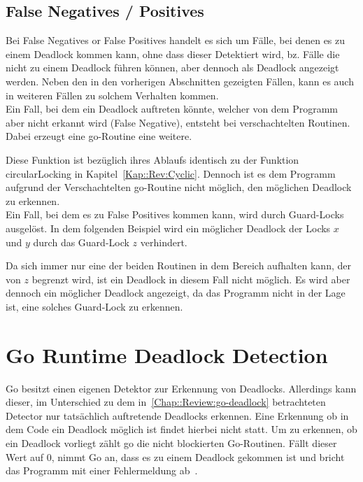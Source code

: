 \subsection{False Negatives / Positives}
Bei False Negatives or False Positives handelt es sich um Fälle, bei denen es 
zu einem Deadlock kommen kann, ohne dass dieser Detektiert wird, bz. Fälle die
nicht zu einem 
Deadlock führen können, aber dennoch als Deadlock angezeigt werden. 
Neben den in den vorherigen Abschnitten gezeigten Fällen, kann es auch in weiteren 
Fällen zu solchem Verhalten kommen.\\
Ein Fall,
bei dem ein Deadlock auftreten könnte, welcher von dem Programm aber nicht erkannt
wird (False Negative), entsteht bei verschachtelten Routinen. Dabei erzeugt eine go-Routine eine 
weitere.
\begin{figure}[H]
    
\end{figure}
Diese Funktion ist bezüglich ihres Ablaufs identisch zu der Funktion 
circularLocking in Kapitel~\ref*{Kap::Rev:Cyclic}. Dennoch ist es dem 
Programm aufgrund der Verschachtelten go-Routine nicht möglich, den möglichen 
Deadlock zu erkennen. \\
Ein Fall, bei dem es zu False Positives kommen kann, wird durch Guard-Locks
ausgelöst. In dem folgenden Beispiel wird ein möglicher Deadlock der Locks $x$
und $y$ durch das Guard-Lock $z$ verhindert.
\begin{figure}[H]
    
\end{figure}
Da sich immer nur eine der beiden Routinen in dem Bereich aufhalten kann, der von 
$z$ begrenzt wird, ist ein Deadlock in diesem Fall nicht möglich. Es wird aber dennoch
ein möglicher Deadlock angezeigt, da das Programm nicht in der Lage ist, eine solches 
Guard-Lock zu erkennen.

\section{Go Runtime Deadlock Detection}
Go besitzt einen eigenen Detektor zur Erkennung von Deadlocks. Allerdings kann 
dieser, im Unterschied zu dem in~\ref{Chap::Review:go-deadlock} betrachteten 
Detector nur tatsächlich auftretende Deadlocks erkennen. Eine Erkennung ob 
in dem Code ein Deadlock möglich ist findet hierbei nicht statt. Um zu erkennen,
ob ein Deadlock vorliegt zählt go die nicht blockierten Go-Routinen.
Fällt dieser Wert auf $0$, nimmt Go an, dass es zu einem Deadlock gekommen 
ist und bricht das Programm mit einer Fehlermeldung ab~\cite{grdd_code}.
